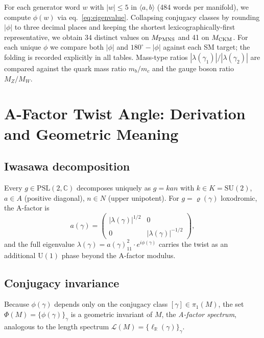 \documentclass[11pt,a4paper]{article}
\newcommand{\PSL}{\mathrm{PSL}(2,\mathbb{C})}
\newcommand{\pioneM}{\pi_1(M)}
\newcommand{\degr}{^{\circ}}
\begin{document}
For each generator word $w$ with $|w|\leq 5$ in $\langle a,b\rangle$ (484 words per manifold),
we compute $\phi(w)$ via eq.~\eqref{eq:eigenvalue}.
Collapsing conjugacy classes by rounding $|\phi|$ to three decimal places and
keeping the shortest lexicographically-first representative, we obtain
34 distinct values on $M_{\rm PMNS}$ and 41 on $M_{\rm CKM}$.
For each unique $\phi$ we compare both $|\phi|$ and $180\degr-|\phi|$
against each SM target; the folding is recorded explicitly in all tables.
Mass-type ratios $|\lambda(\gamma_1)|/|\lambda(\gamma_2)|$ are compared against
the quark mass ratio $m_b/m_c$ and the gauge boson ratio $M_Z/M_W$.

\section{A-Factor Twist Angle: Derivation and Geometric Meaning}
\label{sec:derivation}

\subsection{Iwasawa decomposition}

Every $g\in\PSL$ decomposes uniquely as $g=kan$ with
$k\in K=\mathrm{SU}(2)$, $a\in A$ (positive diagonal), $n\in N$ (upper
unipotent).
For $g=\varrho(\gamma)$ loxodromic, the A-factor is
\begin{equation}
  a(\gamma) =
  \begin{pmatrix}|\lambda(\gamma)|^{1/2}&0\\0&|\lambda(\gamma)|^{-1/2}\end{pmatrix},
\end{equation}
and the full eigenvalue $\lambda(\gamma)=a(\gamma)_{\!11}^2\cdot e^{i\phi(\gamma)}$
carries the twist as an additional $\mathrm{U}(1)$ phase beyond the A-factor modulus.

\subsection{Conjugacy invariance}

Because $\phi(\gamma)$ depends only on the conjugacy class $[\gamma]\in\pioneM$,
the set $\Phi(M)=\{\phi(\gamma)\}_\gamma$ is a geometric invariant of $M$,
the \emph{A-factor spectrum}, analogous to the length spectrum
$\mathcal{L}(M)=\{\ell_{\mathbb{R}}(\gamma)\}_\gamma$.
\end{document}
